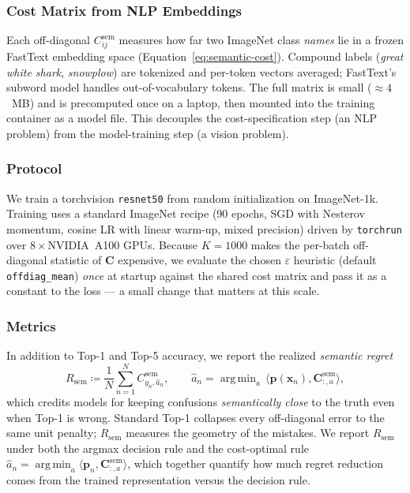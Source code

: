 \documentclass[sigconf,anonymous]{acmart}
\newcommand{\vx}{\mathbf{x}}
\newcommand{\vp}{\mathbf{p}}
\newcommand{\mC}{\mathbf{C}}
\DeclareMathOperator*{\argmin}{arg\,min}
\begin{document}
\subsubsection{Cost Matrix from NLP Embeddings}
Each off-diagonal $C^{\mathrm{sem}}_{ij}$ measures how far two ImageNet class \emph{names} lie in a frozen FastText embedding space (Equation~\ref{eq:semantic-cost}). Compound labels (\emph{great white shark}, \emph{snowplow}) are tokenized and per-token vectors averaged; FastText's subword model handles out-of-vocabulary tokens. The full matrix is small ($\approx 4$~MB) and is precomputed once on a laptop, then mounted into the training container as a model file. This decouples the cost-specification step (an NLP problem) from the model-training step (a vision problem).

\subsubsection{Protocol}
We train a torchvision \texttt{resnet50} from random initialization on ImageNet-1k. Training uses a standard ImageNet recipe (90 epochs, SGD with Nesterov momentum, cosine LR with linear warm-up, mixed precision) driven by \texttt{torchrun} over $8\times$NVIDIA~A100 GPUs. Because $K = 1000$ makes the per-batch off-diagonal statistic of $\mC$ expensive, we evaluate the chosen $\varepsilon$ heuristic (default \texttt{offdiag\_mean}) \emph{once} at startup against the shared cost matrix and pass it as a constant to the loss --- a small change that matters at this scale.

\subsubsection{Metrics}
In addition to Top-1 and Top-5 accuracy, we report the realized \emph{semantic regret}
\[
R_{\mathrm{sem}} \coloneqq \frac{1}{N}\sum_{n=1}^{N} C^{\mathrm{sem}}_{y_n,\hat a_n}, \qquad \hat a_n = \argmin_{a}\, \langle \vp(\vx_n), \mC^{\mathrm{sem}}_{:,a}\rangle,
\]
which credits models for keeping confusions \emph{semantically close} to the truth even when Top-1 is wrong. Standard Top-1 collapses every off-diagonal error to the same unit penalty; $R_{\mathrm{sem}}$ measures the geometry of the mistakes. We report $R_{\mathrm{sem}}$ under both the argmax decision rule and the cost-optimal rule $\hat a_n = \argmin_a \langle \vp_n, \mC^{\mathrm{sem}}_{:,a}\rangle$, which together quantify how much regret reduction comes from the trained representation versus the decision rule.
\end{document}
